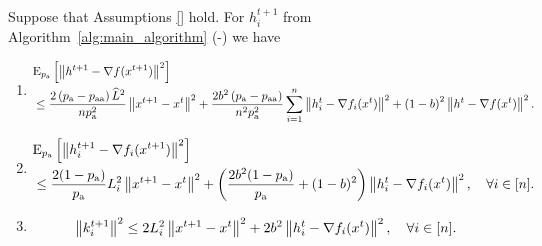 \documentclass{article}
\newcommand*{\probavailable}{\ensuremath{p_{\textnormal{a}}}}
\newcommand*{\probpairaa}{\ensuremath{p_{\textnormal{aa}}}}
\begin{document}
\begin{lemma}
  \label{lemma:gradient}
  Suppose that Assumptions \ref{} hold. For $h^{t+1}_i$ from Algorithm~\ref{alg:main_algorithm} (-) we have
  \begin{enumerate}
  \item
      \begin{align*}
          &\ExpSub{\probavailable}{\norm{h^{t+1} - \nabla f(x^{t+1})}^2} \\
          & \leq \frac{2\left(\probavailable - \probpairaa\right)\widehat{L}^2}{n \probavailable^2} \norm{x^{t+1} - x^{t}}^2 + \frac{2 b^2 \left(\probavailable - \probpairaa\right)}{n^2 \probavailable^2} \sum_{i=1}^n \norm{h^t_i - \nabla f_i(x^{t})}^2 + \left(1 - b\right)^2 \norm{h^{t} - \nabla f(x^{t})}^2.
      \end{align*}
  \item
      \begin{align*}
          &\ExpSub{\probavailable}{\norm{h^{t+1}_i - \nabla f_i(x^{t+1})}^2} \\
          & \leq \frac{2(1 - \probavailable)}{\probavailable} L^2_i \norm{x^{t+1} - x^{t}}^2 + \left(\frac{2 b^2 (1 - \probavailable)}{\probavailable} + (1 - b)^2\right) \norm{h^{t}_i - \nabla f_i(x^{t})}^2, \quad \forall i \in [n].
      \end{align*}
  \item
      \begin{align*}
        &\left\| k^{t+1}_i \right\|^2 \leq 2L^2_i\left\| x^{t+1} - x^{t} \right\|^2 + 2b^2 \left\| h^t_i - \nabla f_i(x^{t}) \right\|^2, \quad \forall i \in [n].
      \end{align*}
  \end{enumerate}
\end{lemma}
\end{document}

